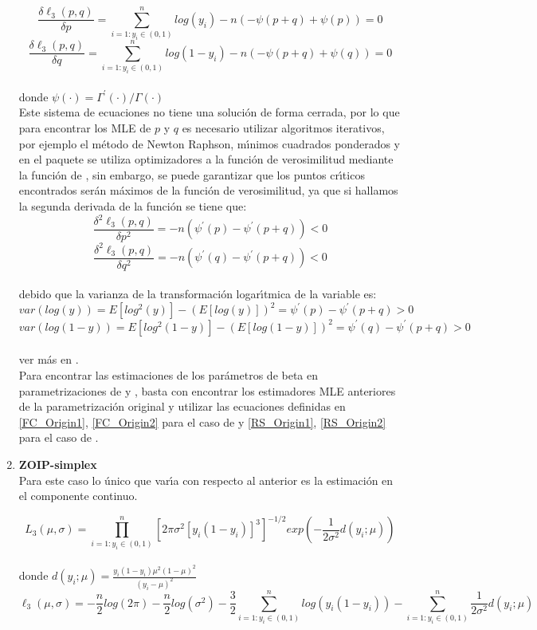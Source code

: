 \begin{enumerate}
\[
\frac{\delta \ell_3(p,q)}{\delta p}=\sum_{i=1:y_i \in (0,1)}^{n}{log(y_i)}-n(-\psi(p+q)+\psi(p))=0
\]
\[
\frac{\delta \ell_3(p,q)}{\delta q}=\sum_{i=1:y_i \in (0,1)}^{n}{log(1-y_i)}-n(-\psi(p+q)+\psi(q))=0
\]
\\
donde $\psi(\cdot)={\Gamma^{'}{(\cdot)}}/{\Gamma(\cdot)}$
\\
Este sistema de ecuaciones no tiene una soluci\'{o}n de forma cerrada, por lo que para encontrar los MLE de $p$ y $q$ es necesario utilizar algoritmos iterativos, por ejemplo el m\'{e}todo de Newton Raphson, m\'{\i}nimos cuadrados ponderados y en el paquete  se utiliza optimizadores a la funci\'{o}n de verosimilitud mediante la funci\'{o}n  de , sin embargo, se puede garantizar que los puntos cr\'{\i}ticos encontrados ser\'{a}n m\'{a}ximos de la funci\'{o}n de verosimilitud, ya que si hallamos la segunda derivada de la funci\'{o}n se tiene que:
\[
\frac{\delta^2 \ell_3(p,q)}{\delta p^2}=-n(\psi^{'}(p)-\psi^{'}(p+q))<0
\]
\[
\frac{\delta^2 \ell_3(p,q)}{\delta q^2}=-n(\psi^{'}(q)-\psi^{'}(p+q))<0
\]
\\
debido que la varianza de la transformaci\'{o}n logar\'{\i}tmica de la variable es:
\[
var(log(y))=E[log^2(y)]-(E[log(y)])^2=\psi^{'}(p)-\psi^{'}(p+q)>0
\]
\[
var(log(1-y))=E[log^2(1-y)]-(E[log(1-y)])^2=\psi^{'}(q)-\psi^{'}(p+q)>0
\]
\\
ver m\'{a}s en \cite{Owen1}.\\

Para encontrar las estimaciones de los par\'{a}metros de beta en parametrizaciones de \cite{Ferrari2} y \cite{Stasinopoulos2}, basta con encontrar los estimadores MLE anteriores de la parametrizaci\'{o}n original y utilizar las ecuaciones definidas en \eqref{FC_Origin1}, \eqref{FC_Origin2} para el caso de \cite{Ferrari2} y \eqref{RS_Origin1}, \eqref{RS_Origin2} para el caso de \cite{Stasinopoulos2}.

\item \textbf{ZOIP-simplex}\\

Para este caso lo \'{u}nico que var\'{\i}a con respecto al anterior es la estimaci\'{o}n en el componente continuo.

\[
L_3(\mu,\sigma)=\prod_{i=1:y_i \in (0,1)}^{n}\left[{2\pi \sigma^{2}[y_i(1-y_i)]^{3}}\right]^{-1/2}exp\left(-\frac{1}{2\sigma^2}d(y_i;\mu)\right)
\]
\\
donde $d(y_i ;\mu)=\frac{y_i(1-y_i)\mu^2(1-\mu)^2}{(y_i-\mu)^2}$
\[
\ell_3(\mu,\sigma)=-\frac{n}{2}log(2\pi)-\frac{n}{2}log(\sigma^2)-\frac{3}{2}\sum_{i=1:y_i \in (0,1)}^{n}{log(y_i(1-y_i))}-\sum_{i=1:y_i \in (0,1)}^{n}{\frac{1}{2\sigma^2}d(y_i;\mu)}
\]


\end{enumerate}
